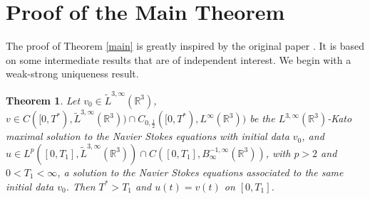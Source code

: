 \documentclass[11pt]{amsart}%
\theoremstyle{plain}
\numberwithin{equation}{section}
\newtheorem{theorem}{Theorem}[section]
\begin{document}
\section{Proof of the Main Theorem}
The proof of Theorem \ref{main} is greatly inspired by the original paper \cite{Lem}. It is based on some intermediate results that are of independent interest. We begin with a weak-strong uniqueness result.
\begin{theorem}\label{WS}
Let $v_0\in\tilde{L}^{3,\infty}(\mathbb{R}^3)$, $v\in C([0,T^\ast),\tilde{L}^{3,\infty}(\mathbb{R}^3))\cap C_{0,\frac{1}{2}}([0,T^\ast),L^\infty(\mathbb{R}^3))$ be the  $ {L}^{3,\infty}(\mathbb{R}^3)$-Kato maximal solution to the Navier Stokes equations with initial data $v_0$, and $u\in L^p([0,T_1],\tilde{L}^{3,\infty}(\mathbb{R}^3))\cap C([0,T_1],B^{-1,\infty}_\infty(\mathbb{R}^3))$, with $p>2$ and $0<T_1<\infty$, a solution to the Navier Stokes equations associated to the same initial data $v_0$. Then $T^\ast>T_1$ and $u(t)=v(t)$ on $[0,T_1]$.
\end{theorem}
\end{document}
